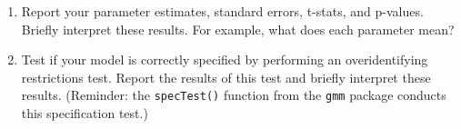 \documentclass[11pt,letterpaper]{article}
\begin{document}
\begin{enumerate}[label=\alph*., leftmargin=*]
	\begin{enumerate}[label=\roman*.]
		\item Report your parameter estimates, standard errors, t-stats, and p-values. Briefly interpret these results. For example, what does each parameter mean?

		\item Test if your model is correctly specified by performing an overidentifying restrictions test. Report the results of this test and briefly interpret these results. (Reminder: the \texttt{specTest()} function from the \texttt{gmm} package conducts this specification test.)
	\end{enumerate}
\end{enumerate}
\end{document}
